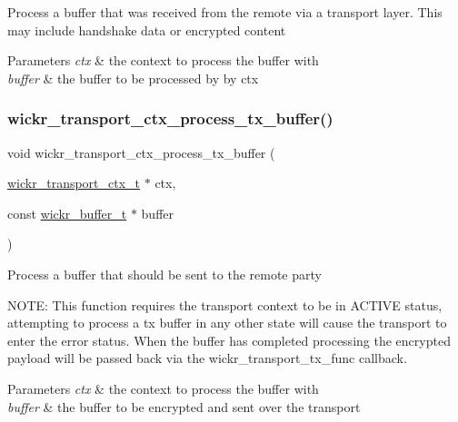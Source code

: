 Process a buffer that was received from the remote via a transport layer. This may include handshake data or encrypted content


\begin{DoxyParams}{Parameters}
{\em ctx} & the context to process the buffer with \\
\hline
{\em buffer} & the buffer to be processed by by \textquotesingle{}ctx\textquotesingle{} \\
\hline
\end{DoxyParams}
\mbox{\label{group__wickr__transport__ctx_gad9d2f86832cfb9c1948ba679fabbedbc}} 
\subsubsection{\texorpdfstring{wickr\+\_\+transport\+\_\+ctx\+\_\+process\+\_\+tx\+\_\+buffer()}{wickr\_transport\_ctx\_process\_tx\_buffer()}}
{\footnotesize\ttfamily void wickr\+\_\+transport\+\_\+ctx\+\_\+process\+\_\+tx\+\_\+buffer (\begin{DoxyParamCaption}\item[{\hyperlink{structwickr__transport__ctx}{wickr\+\_\+transport\+\_\+ctx\+\_\+t} $\ast$}]{ctx,  }\item[{const \hyperlink{structwickr__buffer}{wickr\+\_\+buffer\+\_\+t} $\ast$}]{buffer }\end{DoxyParamCaption})}

Process a buffer that should be sent to the remote party

N\+O\+TE\+: This function requires the transport context to be in A\+C\+T\+I\+VE status, attempting to process a tx buffer in any other state will cause the transport to enter the error status. When the buffer has completed processing the encrypted payload will be passed back via the wickr\+\_\+transport\+\_\+tx\+\_\+func callback.


\begin{DoxyParams}{Parameters}
{\em ctx} & the context to process the buffer with \\
\hline
{\em buffer} & the buffer to be encrypted and sent over the transport \\
\hline
\end{DoxyParams}
\mbox{\label{group__wickr__transport__ctx_ga599461036962c38cdb453477288f2b4a}} 
